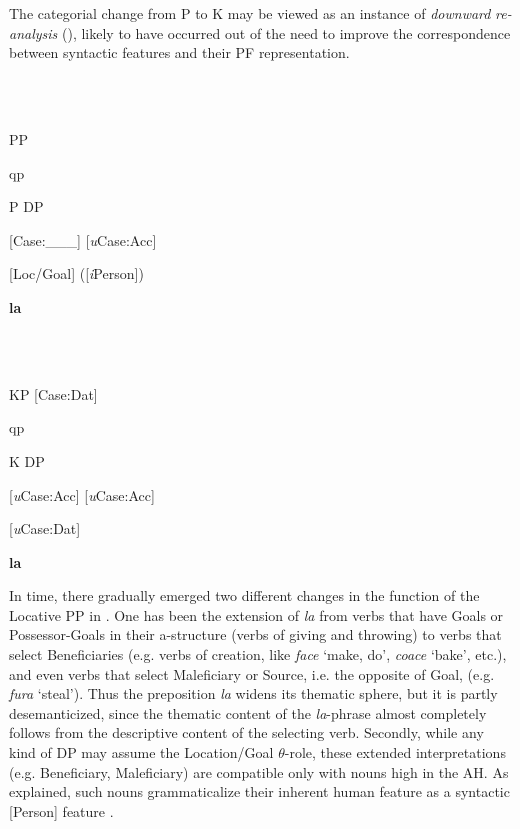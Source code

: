 \documentclass[output=paper,modfonts,nonflat]{langsci/langscibook}
\begin{document}
The categorial change from P to K may be viewed as an instance of \textit{downward} \textit{re-analysis} (\citealt{RobertsRoussou2003}), likely to have occurred out of the need to improve the correspondence between syntactic features and their PF representation.

\ea%
    \label{ex:key:12}
    \gll\\
        \\
    \glt
    \z

                  PP        

    qp

P      DP      

    [Case:\_\_\_]    [\textit{u}Case:Acc]

    [Loc/Goal]    ([\textit{i}Person])

    \textbf{la}

\ea%
    \label{ex:key:13}
    \gll\\
        \\
    \glt
    \z

              KP [Case:Dat]

    qp

    K      DP

    [\textit{u}Case:Acc]    [\textit{u}Case:Acc]

    [\textit{u}Case:Dat]

    \textbf{la}

In time, there gradually emerged two different changes in the function of the Locative PP in . One has been the extension of \textit{la} from verbs that have Goals or Possessor-Goals in their a-structure (verbs of giving and throwing) to verbs that select Beneficiaries (e.g. verbs of creation, like \textit{face} ‘make, do’, \textit{coace} ‘bake’, etc.), and even verbs that select Maleficiary or Source, i.e. the opposite of Goal, (e.g. \textit{fura} ‘steal’). Thus the preposition \textit{la} widens its thematic sphere, but it is partly desemanticized, since the thematic content of the \textit{la}{}-phrase almost completely follows from the descriptive content of the selecting verb. Secondly, while any kind of DP may assume the Location/Goal ${\theta}${}-role, these extended interpretations (e.g. Beneficiary, Maleficiary) are compatible only with nouns high in the AH. As explained, such nouns grammaticalize their inherent human feature as a syntactic [Person] feature \citep{Richards2008}.

\ea%
    \label{ex:key:14}
    \gll\\
        \\
    \glt
    \z
\end{document}
